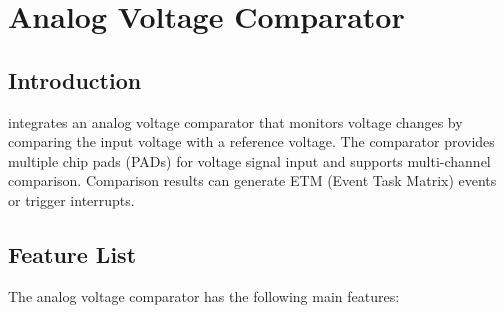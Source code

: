 \documentclass[main\_\_EN.tex]{subfiles}
\begin{document}
\setenglishformatting

\ifglobal
\else
    \clearpage
    \listoftodos
    \listofdonetodos
    \tableofcontents
\fi



\hypertarget{anacom}{}
\chapter{Analog Voltage Comparator}
\label{mod:anacom}


\section{Introduction}

\chipname{} integrates an analog voltage comparator that monitors voltage changes by comparing the input voltage with a reference voltage. The comparator provides multiple chip pads (PADs) for voltage signal input and supports multi-channel comparison. Comparison results can generate ETM (Event Task Matrix) events or trigger interrupts.



\section{Feature List}
\label{sec:anacom-features}

The analog voltage comparator has the following main features:
\end{document}
